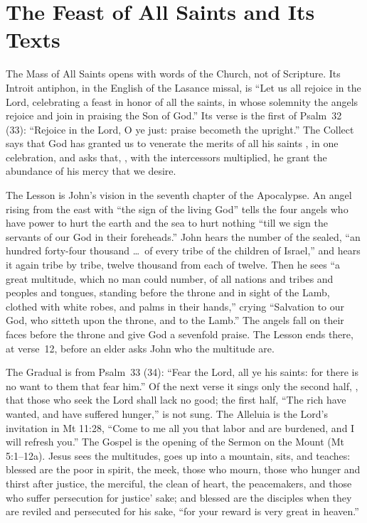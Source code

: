 \section{The Feast of All Saints and Its Texts}
\label{sec:opening}

The Mass of All Saints opens with words of the Church, not of Scripture. Its
Introit antiphon, in the English of the Lasance missal, is ``Let us all rejoice
in the Lord, celebrating a feast in honor of all the saints, in whose solemnity
the angels rejoice and join in praising the Son of God.'' Its verse is the
first of Psalm~32 (33): ``Rejoice in the Lord, O ye just: praise becometh the
upright.'' The Collect says that God has granted us to venerate the merits of
all his saints , in one celebration, and asks that,
, with the intercessors multiplied, he
grant the abundance of his mercy that we desire.

The Lesson is John's vision in the seventh chapter of the Apocalypse. An angel
rising from the east with ``the sign of the living God'' tells the four angels
who have power to hurt the earth and the sea to hurt nothing ``till we sign the
servants of our God in their foreheads.'' John hears the number of the sealed,
``an hundred forty-four thousand \dots\ of every tribe of the children of
Israel,'' and hears it again tribe by tribe, twelve thousand from each of
twelve. Then he sees ``a great multitude, which no man could number, of all
nations and tribes and peoples and tongues, standing before the throne and in
sight of the Lamb, clothed with white robes, and palms in their hands,'' crying
``Salvation to our God, who sitteth upon the throne, and to the Lamb.'' The
angels fall on their faces before the throne and give God a sevenfold praise.
The Lesson ends there, at verse~12, before an elder asks John who the multitude
are.

The Gradual is from Psalm~33 (34): ``Fear the Lord, all ye his saints: for
there is no want to them that fear him.'' Of the next verse it sings only the
second half, , that
those who seek the Lord shall lack no good; the first half, ``The rich have
wanted, and have suffered hunger,'' is not sung. The Alleluia is the Lord's
invitation in Mt 11:28, ``Come to me all you that labor and are burdened, and I
will refresh you.'' The Gospel is the opening of the Sermon on the Mount
(Mt 5:1--12a). Jesus sees the multitudes, goes up into a mountain, sits, and
teaches: blessed are the poor in spirit, the meek, those who mourn, those who
hunger and thirst after justice, the merciful, the clean of heart, the
peacemakers, and those who suffer persecution for justice' sake; and blessed
are the disciples when they are reviled and persecuted for his sake, ``for
your reward is very great in heaven.''

